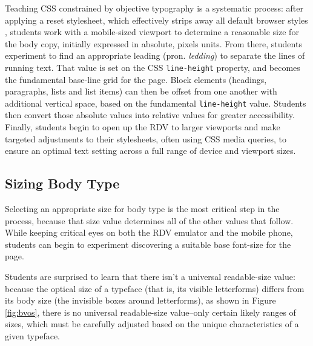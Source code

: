 \documentclass[sigconf,sigplan,review,anonymous]{acmart}
\begin{document}
Teaching CSS constrained by objective typography is a systematic process: after applying a reset stylesheet, which effectively strips away all default browser styles \cite{em:rc}, students work with a mobile-sized viewport to determine a reasonable size for the body copy, initially expressed in absolute, pixels units. From there, students experiment to find an appropriate leading (pron. {\itshape ledding}) to separate the lines of running text. That value is set on the CSS \verb|line-height| property, and becomes the fundamental base-line grid for the page. Block elements (headings, paragraphs, lists and list items) can then be offset from one another with additional vertical space, based on the fundamental \verb|line-height| value. Students then convert those absolute values into relative values for greater accessibility. Finally, students begin to open up the RDV to larger viewports and make targeted adjustments to their stylesheets, often using CSS media queries, to ensure an optimal text setting across a full range of device and viewport sizes.

\subsection{Sizing Body Type}

Selecting an appropriate size for body type is the most critical step in the process, because that size value determines all of the other values that follow. While keeping critical eyes on both the RDV emulator and the mobile phone, students can begin to experiment discovering a suitable base font-size for the page.

Students are surprised to learn that there isn’t a universal readable-size value: because the optical size of a typeface (that is, its visible letterforms) differs from its body size (the invisible boxes around letterforms), as shown in Figure \ref{fig:bvos}, there is no universal readable-size value--only certain likely ranges of sizes, which must be carefully adjusted based on the unique characteristics of a given typeface.
\end{document}
